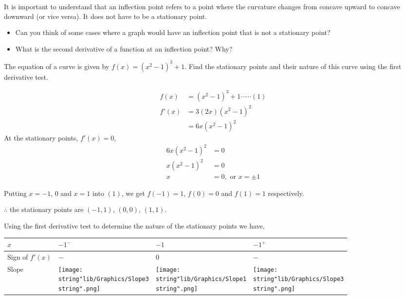 \documentclass[11pt,a4paper]{book}
\begin{document}
It is important to understand that an inflection point refers to a
point where the curvature changes from concave upward to concave downward
(or vice versa). It does not have to be a stationary point.
\begin{itemize}
\item Can you think of some cases where a graph would have an inflection
point that is not a stationary point?
\item What is the second derivative of a function at an inflection point?
Why?
\end{itemize}

\begin{example}

The equation of a curve is given by $f\left(x\right)=\left(x^{2}-1\right)^{3}+1$.
Find the stationary points and their nature of this curve using the
first derivative test.

\Solution

\begin{align*}
f\left(x\right) & =\left(x^{2}-1\right)^{3}+1\cdots\cdots(1)\\
f'\left(x\right) & =3\left(2x\right)\left(x^{2}-1\right)^{2}\\
 & =6x\left(x^{2}-1\right)^{2}
\end{align*}
At the stationary points, $f'\left(x\right)=0$,
\begin{align*}
6x\left(x^{2}-1\right)^{2} & =0\\
x\left(x^{2}-1\right)^{2} & =0\\
x & =0,\text{ or }x=\pm1
\end{align*}

Putting $x=-1$, $0$ and $x=1$ into $\left(1\right)$, we get $f\left(-1\right)=1$,
$f\left(0\right)=0$ and $f\left(1\right)=1$ respectively.

$\therefore$ the stationary points are $\left(-1,1\right)$, $\left(0,0\right)$,
$\left(1,1\right)$.

Using the first derivative test to determine the nature of the stationary
points we have,
\begin{center}
\begin{tabular}[t]{|>{\centering}m{1.8cm}|>{\centering}m{1.3cm}|>{\centering}m{1.3cm}|>{\centering}m{1.3cm}|}
\hline
$x$ & $-1^{-}$ & $-1$ & $-1^{+}$\tabularnewline
\hline
Sign of $f'(x)$ & $-$ & $0$ & $-$\tabularnewline
\hline
Slope & \texttt{[image: \\string"lib/Graphics/Slope3\\string".png]} & \texttt{[image: \\string"lib/Graphics/Slope1\\string".png]} & \texttt{[image: \\string"lib/Graphics/Slope3\\string".png]}\tabularnewline
\hline
\end{tabular}
\par\end{center}


\end{example}
\end{document}

